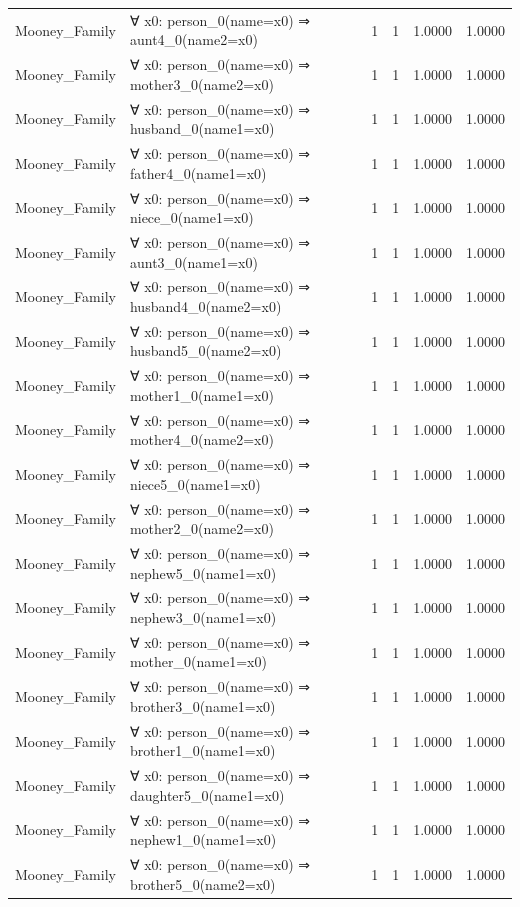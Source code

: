 \documentclass[11pt,a4paper]{article}
\begin{document}
\begin{table}[h!]
\begin{longtable}{|l|p{6cm}|c|c|c|c|}
Mooney_Family & ∀ x0: person\_0(name=x0) ⇒ aunt4\_0(name2=x0) & 1 & 1 & 1.0000 & 1.0000 \\
Mooney_Family & ∀ x0: person\_0(name=x0) ⇒ mother3\_0(name2=x0) & 1 & 1 & 1.0000 & 1.0000 \\
Mooney_Family & ∀ x0: person\_0(name=x0) ⇒ husband\_0(name1=x0) & 1 & 1 & 1.0000 & 1.0000 \\
Mooney_Family & ∀ x0: person\_0(name=x0) ⇒ father4\_0(name1=x0) & 1 & 1 & 1.0000 & 1.0000 \\
Mooney_Family & ∀ x0: person\_0(name=x0) ⇒ niece\_0(name1=x0) & 1 & 1 & 1.0000 & 1.0000 \\
Mooney_Family & ∀ x0: person\_0(name=x0) ⇒ aunt3\_0(name1=x0) & 1 & 1 & 1.0000 & 1.0000 \\
Mooney_Family & ∀ x0: person\_0(name=x0) ⇒ husband4\_0(name2=x0) & 1 & 1 & 1.0000 & 1.0000 \\
Mooney_Family & ∀ x0: person\_0(name=x0) ⇒ husband5\_0(name2=x0) & 1 & 1 & 1.0000 & 1.0000 \\
Mooney_Family & ∀ x0: person\_0(name=x0) ⇒ mother1\_0(name1=x0) & 1 & 1 & 1.0000 & 1.0000 \\
Mooney_Family & ∀ x0: person\_0(name=x0) ⇒ mother4\_0(name2=x0) & 1 & 1 & 1.0000 & 1.0000 \\
Mooney_Family & ∀ x0: person\_0(name=x0) ⇒ niece5\_0(name1=x0) & 1 & 1 & 1.0000 & 1.0000 \\
Mooney_Family & ∀ x0: person\_0(name=x0) ⇒ mother2\_0(name2=x0) & 1 & 1 & 1.0000 & 1.0000 \\
Mooney_Family & ∀ x0: person\_0(name=x0) ⇒ nephew5\_0(name1=x0) & 1 & 1 & 1.0000 & 1.0000 \\
Mooney_Family & ∀ x0: person\_0(name=x0) ⇒ nephew3\_0(name1=x0) & 1 & 1 & 1.0000 & 1.0000 \\
Mooney_Family & ∀ x0: person\_0(name=x0) ⇒ mother\_0(name1=x0) & 1 & 1 & 1.0000 & 1.0000 \\
Mooney_Family & ∀ x0: person\_0(name=x0) ⇒ brother3\_0(name1=x0) & 1 & 1 & 1.0000 & 1.0000 \\
Mooney_Family & ∀ x0: person\_0(name=x0) ⇒ brother1\_0(name1=x0) & 1 & 1 & 1.0000 & 1.0000 \\
Mooney_Family & ∀ x0: person\_0(name=x0) ⇒ daughter5\_0(name1=x0) & 1 & 1 & 1.0000 & 1.0000 \\
Mooney_Family & ∀ x0: person\_0(name=x0) ⇒ nephew1\_0(name1=x0) & 1 & 1 & 1.0000 & 1.0000 \\
Mooney_Family & ∀ x0: person\_0(name=x0) ⇒ brother5\_0(name2=x0) & 1 & 1 & 1.0000 & 1.0000 \\

\end{longtable}
\end{table}
\end{document}
